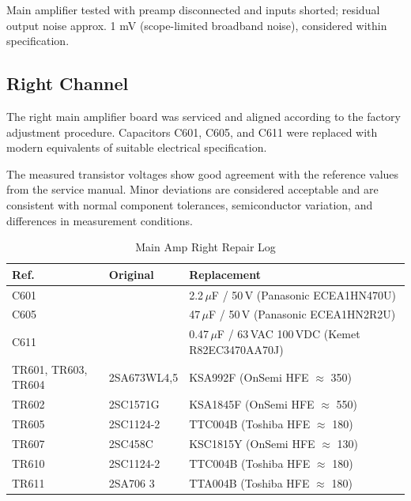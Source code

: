 \documentclass[]{article}
\begin{document}
Main amplifier tested with preamp disconnected and inputs shorted; residual output noise approx. 1 mV (scope-limited broadband noise), considered within specification.

\subsection{Right Channel}

The right main amplifier board was serviced and aligned according to the factory adjustment procedure. Capacitors C601, C605, and C611 were replaced with modern equivalents of suitable electrical specification.

The measured transistor voltages show good agreement with the reference values from the service manual. Minor deviations are considered acceptable and are consistent with normal component tolerances, semiconductor variation, and differences in measurement conditions.

\begin{table}[H]
	\centering
	\caption{Main Amp Right Repair Log}
	\label{tab:repair_log_main_right}
	\begin{tabular}{|l|l|l|}
		\hline
		\textbf{Ref.} & \textbf{Original} & \textbf{Replacement} \\
		\hline
		C601 &  &   2.2\,$\mu$F / 50\,V (Panasonic ECEA1HN470U) \\
        C605 &  &   47\,$\mu$F / 50\,V (Panasonic ECEA1HN2R2U)\\ 
		C611 &  &   0.47\,$\mu$F / 63\,VAC 100\,VDC (Kemet R82EC3470AA70J) \\ 
		TR601, TR603, TR604 & 2SA673WL4,5 & KSA992F (OnSemi HFE $\approx$ 350) \\
                TR602 & 2SC1571G & KSA1845F (OnSemi HFE $\approx$ 550) \\
                TR605 & 2SC1124-2 & TTC004B (Toshiba HFE $\approx$ 180) \\
                TR607 & 2SC458C & KSC1815Y (OnSemi HFE $\approx$ 130)\\
                TR610 & 2SC1124-2 & TTC004B  (Toshiba HFE $\approx$ 180) \\
                TR611 & 2SA706 3 & TTA004B (Toshiba HFE $\approx$ 180) \\
		\hline
	\end{tabular}
\end{table}
\end{document}
